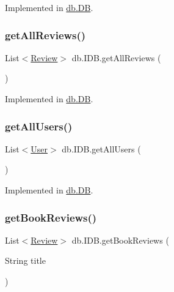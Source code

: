 Implemented in \hyperlink{classdb_1_1_d_b_ab4fbfd3716967ce37cc462ca04c68ca8}{db.\+DB}.

\mbox{\label{interfacedb_1_1_i_d_b_a08f60c8b923599c650f04b4192d00d55}} 
\subsubsection{\texorpdfstring{get\+All\+Reviews()}{getAllReviews()}}
{\footnotesize\ttfamily List$<$\hyperlink{classserver_1_1data_1_1_review}{Review}$>$ db.\+I\+D\+B.\+get\+All\+Reviews (\begin{DoxyParamCaption}{ }\end{DoxyParamCaption})}



Implemented in \hyperlink{classdb_1_1_d_b_ac7a84c5621f4ad2263cd830dbf10842e}{db.\+DB}.

\mbox{\label{interfacedb_1_1_i_d_b_a39ad15619eae3d0ec652e1849e3ebd50}} 
\subsubsection{\texorpdfstring{get\+All\+Users()}{getAllUsers()}}
{\footnotesize\ttfamily List$<$\hyperlink{classserver_1_1data_1_1_user}{User}$>$ db.\+I\+D\+B.\+get\+All\+Users (\begin{DoxyParamCaption}{ }\end{DoxyParamCaption})}



Implemented in \hyperlink{classdb_1_1_d_b_ad02e4c78f9afe64af34fb2e5889ce501}{db.\+DB}.

\mbox{\label{interfacedb_1_1_i_d_b_a6b8fda48df77b542b8713bc4f035bccf}} 
\subsubsection{\texorpdfstring{get\+Book\+Reviews()}{getBookReviews()}}
{\footnotesize\ttfamily List$<$\hyperlink{classserver_1_1data_1_1_review}{Review}$>$ db.\+I\+D\+B.\+get\+Book\+Reviews (\begin{DoxyParamCaption}\item[{String}]{title }\end{DoxyParamCaption})}



